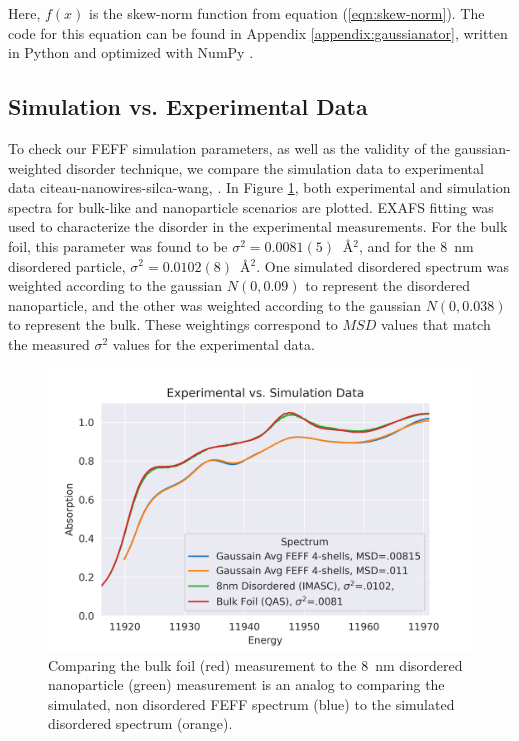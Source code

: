 \noindent
Here, $ f(x) $ is the skew-norm function from equation (\ref{eqn:skew-norm}). The code for this equation can be found in Appendix \ref{appendix:gaussianator}, written in Python and optimized with NumPy \cite{numpy}.

\subsection{Simulation vs. Experimental Data} \label{sec:end-disorder}

To check our FEFF simulation parameters, as well as the validity of the gaussian-weighted disorder technique, we compare the simulation data to experimental data 
cite{au-nanowires-silca-wang}, \cite{crooks-55nm-au-exp} \cite{jing-au-nanoparticle-exp} \cite{au-nanowires-silca-wang}. In Figure \ref{fig:avg-experimental-vs-simulation}, both experimental and simulation spectra for bulk-like and nanoparticle scenarios are plotted. EXAFS fitting was used to characterize the disorder in the experimental measurements. For the bulk foil, this parameter was found to be $ \sigma^2=0.0081(5)~$ {\AA}$ ^2 $, and for the 8~nm disordered particle, $ \sigma^2=0.0102(8) $~{\AA}$ ^2 $.  One simulated disordered spectrum was weighted according to the gaussian $ N(0, 0.09) $ to represent the disordered nanoparticle, and the other was weighted according to the gaussian $ N(0, 0.038)  $ to represent the bulk. These weightings correspond to $ MSD $ values that match the measured $ \sigma^2 $ values for the experimental data.  

\begin{figure}[h]
	\centering
	\includegraphics[width=.75\linewidth]{Chapters/Figures/updated_bulk_8nm_disorder_experimental_theory_comparison.png}
	\caption[Simulation vs. Experimental]{Comparing the bulk foil (red) measurement to the 8~nm disordered nanoparticle (green) measurement is an analog to comparing the simulated, non disordered FEFF spectrum (blue) to the simulated disordered spectrum (orange).}
	\label{fig:avg-experimental-vs-simulation}
\end{figure}

